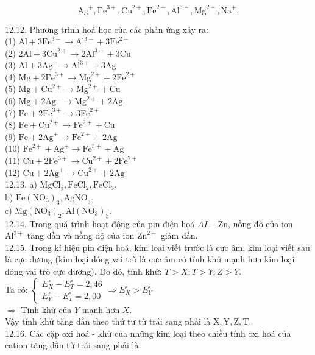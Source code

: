 \documentclass[10pt]{article}
\begin{document}
$$
\mathrm{Ag}^{+}, \mathrm{Fe}^{3+}, \mathrm{Cu}^{2+}, \mathrm{Fe}^{2+}, \mathrm{Al}^{3+}, \mathrm{Mg}^{2+}, \mathrm{Na}^{+} .
$$

12.12. Phương trình hoá học của các phản ứng xảy ra:\\
(1) $\mathrm{Al}+3 \mathrm{Fe}^{3+} \rightarrow \mathrm{Al}^{3+}+3 \mathrm{Fe}^{2+}$\\
(2) $2 \mathrm{Al}+3 \mathrm{Cu}^{2+} \rightarrow 2 \mathrm{Al}^{3+}+3 \mathrm{Cu}$\\
(3) $\mathrm{Al}+3 \mathrm{Ag}^{+} \rightarrow \mathrm{Al}^{3+}+3 \mathrm{Ag}$\\
(4) $\mathrm{Mg}+2 \mathrm{Fe}^{3+} \rightarrow \mathrm{Mg}^{2+}+2 \mathrm{Fe}^{2+}$\\
(5) $\mathrm{Mg}+\mathrm{Cu}^{2+} \rightarrow \mathrm{Mg}^{2+}+\mathrm{Cu}$\\
(6) $\mathrm{Mg}+2 \mathrm{Ag}^{+} \rightarrow \mathrm{Mg}^{2+}+2 \mathrm{Ag}$\\
(7) $\mathrm{Fe}+2 \mathrm{Fe}^{3+} \rightarrow 3 \mathrm{Fe}^{2+}$\\
(8) $\mathrm{Fe}+\mathrm{Cu}^{2+} \rightarrow \mathrm{Fe}^{2+}+\mathrm{Cu}$\\
(9) $\mathrm{Fe}+2 \mathrm{Ag}^{+} \rightarrow \mathrm{Fe}^{2+}+2 \mathrm{Ag}$\\
(10) $\mathrm{Fe}^{2+}+\mathrm{Ag}^{+} \rightarrow \mathrm{Fe}^{3+}+\mathrm{Ag}$\\
(11) $\mathrm{Cu}+2 \mathrm{Fe}^{3+} \rightarrow \mathrm{Cu}^{2+}+2 \mathrm{Fe}^{2+}$\\
(12) $\mathrm{Cu}+2 \mathrm{Ag}^{+} \rightarrow \mathrm{Cu}^{2+}+2 \mathrm{Ag}$\\
12.13. a) $\mathrm{MgCl}_{2}, \mathrm{FeCl}_{2}, \mathrm{FeCl}_{3}$.\\
b) $\mathrm{Fe}\left(\mathrm{NO}_{3}\right)_{3}, \mathrm{AgNO}_{3}$.\\
c) $\mathrm{Mg}\left(\mathrm{NO}_{3}\right)_{2}, \mathrm{Al}\left(\mathrm{NO}_{3}\right)_{3}$.\\
12.14. Trong quá trình hoạt động của pin điện hoá $A I-\mathrm{Zn}$, nồng độ của ion $\mathrm{Al}^{3+}$ tăng dần và nồng độ của ion $\mathrm{Zn}^{2+}$ giảm dần.\\
12.15. Trong kí hiệu pin điện hoá, kim loại viết trước là cực âm, kim loại viết sau là cực dương (kim loại đóng vai trò là cực âm có tính khử mạnh hơn kim loại đóng vai trò cực dương). Do đó, tính khử: $T>X ; T>Y ; Z>Y$.\\
Ta có: $\left\{\begin{array}{l}E_{X}^{\circ}-E_{T}^{\circ}=2,46 \\ E_{Y}^{\circ}-E_{T}^{\circ}=2,00\end{array} \Rightarrow E_{X}^{\circ}>E_{Y}^{\circ}\right.$\\
$\Rightarrow$ Tính khử của $Y$ mạnh hơn $X$.\\
Vậy tính khử tăng dần theo thứ tự từ trái sang phải là $\mathrm{X}, \mathrm{Y}, \mathrm{Z}, \mathrm{T}$.\\
12.16. Các cặp oxi hoá - khử của những kim loại theo chiều tính oxi hoá của cation tăng dần từ trái sang phải là:
\end{document}
